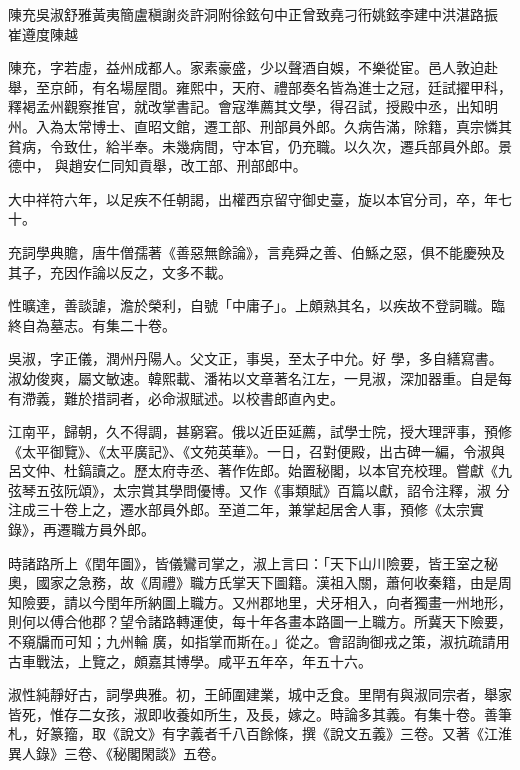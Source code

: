 
\begin{pinyinscope}

 陳充吳淑舒雅黃夷簡盧稹謝炎許洞附徐鉉句中正曾致堯刁衎姚鉉李建中洪湛路振
 崔遵度陳越



 陳充，字若虛，益州成都人。家素豪盛，少以聲酒自娛，不樂從宦。邑人敦迫赴舉，至京師，有名場屋間。雍熙中，天府、禮部奏名皆為進士之冠，廷試擢甲科，釋褐孟州觀察推官，就改掌書記。會寇準薦其文學，得召試，授殿中丞，出知明州。入為太常博士、直昭文館，遷工部、刑部員外郎。久病告滿，除籍，真宗憐其貧病，令致仕，給半奉。未幾病間，守本官，仍充職。以久次，遷兵部員外郎。景德中，
 與趙安仁同知貢舉，改工部、刑部郎中。



 大中祥符六年，以足疾不任朝謁，出權西京留守御史臺，旋以本官分司，卒，年七十。



 充詞學典贍，唐牛僧孺著《善惡無餘論》，言堯舜之善、伯鯀之惡，俱不能慶殃及其子，充因作論以反之，文多不載。



 性曠達，善談謔，澹於榮利，自號「中庸子」。上頗熟其名，以疾故不登詞職。臨終自為墓志。有集二十卷。



 吳淑，字正儀，潤州丹陽人。父文正，事吳，至太子中允。好
 學，多自繕寫書。淑幼俊爽，屬文敏速。韓熙載、潘祐以文章著名江左，一見淑，深加器重。自是每有滯義，難於措詞者，必命淑賦述。以校書郎直內史。



 江南平，歸朝，久不得調，甚窮窘。俄以近臣延薦，試學士院，授大理評事，預修《太平御覽》、《太平廣記》、《文苑英華》。一日，召對便殿，出古碑一編，令淑與呂文仲、杜鎬讀之。歷太府寺丞、著作佐郎。始置秘閣，以本官充校理。嘗獻《九弦琴五弦阮頌》，太宗賞其學問優博。又作《事類賦》百篇以獻，詔令注釋，淑
 分注成三十卷上之，遷水部員外郎。至道二年，兼掌起居舍人事，預修《太宗實錄》，再遷職方員外郎。



 時諸路所上《閏年圖》，皆儀鸞司掌之，淑上言曰：「天下山川險要，皆王室之秘奧，國家之急務，故《周禮》職方氏掌天下圖籍。漢祖入關，蕭何收秦籍，由是周知險要，請以今閏年所納圖上職方。又州郡地里，犬牙相入，向者獨畫一州地形，則何以傅合他郡？望令諸路轉運使，每十年各畫本路圖一上職方。所冀天下險要，不窺牖而可知；九州輪
 廣，如指掌而斯在。」從之。會詔詢御戎之策，淑抗疏請用古車戰法，上覽之，頗嘉其博學。咸平五年卒，年五十六。



 淑性純靜好古，詞學典雅。初，王師圍建業，城中乏食。里閈有與淑同宗者，舉家皆死，惟存二女孩，淑即收養如所生，及長，嫁之。時論多其義。有集十卷。善筆札，好篆籀，取《說文》有字義者千八百餘條，撰《說文五義》三卷。又著《江淮異人錄》三卷、《秘閣閑談》五卷。




\end{pinyinscope}
